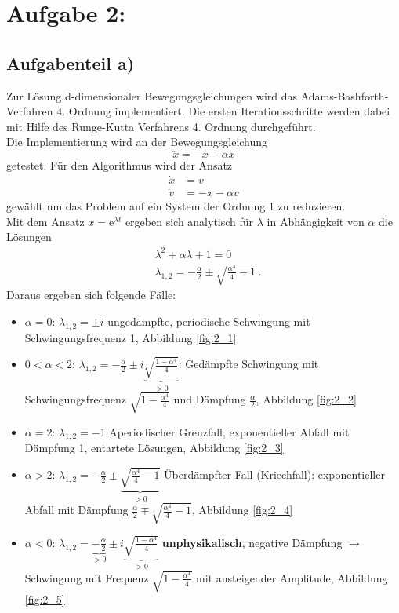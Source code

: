 \section*{Aufgabe 2: }

\subsection*{Aufgabenteil a)}

Zur Lösung d-dimensionaler Bewegungsgleichungen wird das Adams-Bashforth-Verfahren 4. Ordnung implementiert.
Die ersten Iterationsschritte werden dabei mit Hilfe des Runge-Kutta Verfahrens 4. Ordnung durchgeführt. \\
Die Implementierung wird an der Bewegungsgleichung
\begin{equation}
  \ddot{x}=-x-\alpha\dot{x}
  \label{eqn:Bwgl_2}
\end{equation}
getestet.
Für den Algorithmus wird der Ansatz
\begin{align}
  \dot{x}&=v \\
  \dot{v}&=-x-\alpha v
\end{align}
gewählt um das Problem auf ein System der Ordnung 1 zu reduzieren. \\
Mit dem Ansatz $x=\text{e}^{\lambda t}$ ergeben sich analytisch für $\lambda$ in Abhängigkeit von $\alpha$ die Lösungen
\begin{align}
  &\lambda^2+\alpha\lambda +1=0 \\
  &\lambda_{1,2}=-\frac{\alpha}{2}\pm \sqrt{\frac{\alpha^4}{4}-1} \: .
\end{align}
Daraus ergeben sich folgende Fälle:
\begin{itemize}
  \item $\alpha=0$: $\lambda_{1,2}=\pm i$ ungedämpfte, periodische Schwingung mit Schwingungsfrequenz 1, Abbildung \ref{fig:2_1}
  \item $0<\alpha<2$: $\lambda_{1,2}=-\frac{\alpha}{2} \pm i\underbrace{\sqrt{\frac{1-\alpha^4}{4}}}_{>0}$: Gedämpfte Schwingung mit Schwingungsfrequenz $\sqrt{1-\frac{\alpha^4}{4}}$ und Dämpfung $\frac{\alpha}{2}$, Abbildung \ref{fig:2_2}
  \item $\alpha=2$: $\lambda_{1,2}=-1$ Aperiodischer Grenzfall, exponentieller Abfall mit Dämpfung 1, entartete Lösungen, Abbildung \ref{fig:2_3}
  \item $\alpha>2$: $\lambda_{1,2}=-\frac{\alpha}{2}\pm \underbrace{\sqrt{\frac{\alpha^4}{4}-1}}_{>0}$ Überdämpfter Fall (Kriechfall): exponentieller Abfall mit Dämpfung $\frac{\alpha}{2}\mp \sqrt{\frac{\alpha^4}{4}-1}$, Abbildung \ref{fig:2_4}
  \item $\alpha<0$: $\lambda_{1,2}=\underbrace{-\frac{\alpha}{2}}_{>0} \pm i\underbrace{\sqrt{\frac{1-\alpha^4}{4}}}_{>0}$ \textbf{unphysikalisch}, negative Dämpfung $\to$ Schwingung mit Frequenz $\sqrt{1-\frac{\alpha^4}{4}}$ mit ansteigender Amplitude, Abbildung \ref{fig:2_5}
\end{itemize}
